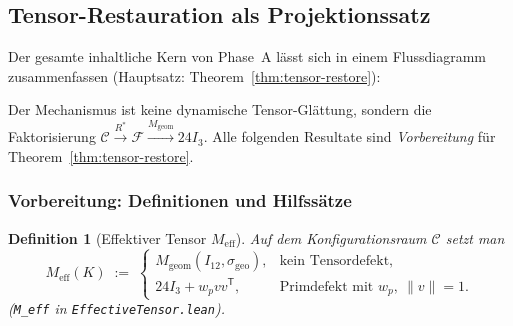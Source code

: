 \documentclass[11pt,a4paper]{article}
\newtheorem{definition}{Definition}
\begin{document}
	\subsection{Tensor-Restauration als Projektionssatz}
	\label{sec:tensor-projection}
	
	Der gesamte inhaltliche Kern von Phase~A lässt sich in einem Flussdiagramm
	zusammenfassen (Hauptsatz: Theorem~\ref{thm:tensor-restore}):
	
	\begin{center}
	\end{center}
	
	Der Mechanismus ist keine dynamische Tensor-Glättung, sondern die Faktorisierung
	$\mathcal{C}\xrightarrow{R^*}\mathcal{F}\xrightarrow{M_{\mathrm{geom}}}24I_3$.
	Alle folgenden Resultate sind \emph{Vorbereitung} für
	Theorem~\ref{thm:tensor-restore}.
	
	\subsubsection{Vorbereitung: Definitionen und Hilfssätze}
	
	\begin{definition}[Effektiver Tensor $M_{\mathrm{eff}}$]
		\label{def:m-eff}
		Auf dem Konfigurationsraum $\mathcal{C}$ setzt man
		\[
		M_{\mathrm{eff}}(K)
		\;:=\;
		\begin{cases}
			M_{\mathrm{geom}}(I_{12},\sigma_{\mathrm{geo}}), & \text{kein Tensordefekt},\\[4pt]
			24I_3+w_pvv^{\mathsf T}, & \text{Primdefekt mit }w_p,\ \|v\|=1.
		\end{cases}
		\]
		(\texttt{M\_eff} in \texttt{EffectiveTensor.lean}).
	\end{definition}
	
\end{document}
